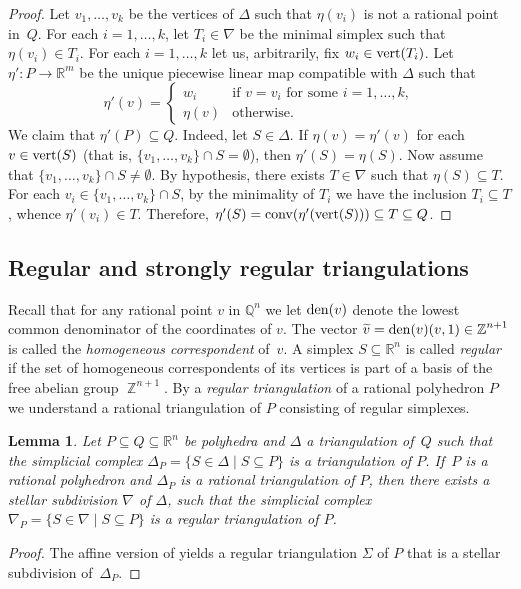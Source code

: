 \documentclass[reqno, draft]{amsart}
\newtheorem{lemma}[theorem]{Lemma}
\theoremstyle{definition}
\begin{document}
\begin{proof}
Let $v_1,\ldots,v_k$ be the vertices of $\Delta$ 
such that  $\eta(v_i)$ is not a rational point in~$Q$. 
For each $i=1,\ldots,k$, 
let $T_i\in\nabla$ be the minimal simplex  
such that  $\eta(v_i)\in T_i$. 
For each $i=1,\ldots,k$ let us, arbitrarily, 
fix $w_i\in \operatorname{{\rm vert}}(T_i)$. 
Let $\eta'\colon P\to {\mathbb{R}}^m$ 
be the unique piecewise linear map 
compatible with $\Delta$ such that 
\[
\eta'(v)=
\begin{cases}
  w_i&\mbox{if }v=v_i \mbox{ for some }i=1,\ldots,k,\\
  \eta(v)& \mbox{otherwise.}
\end{cases}
\]
We claim that $\eta'(P)\subseteq Q$. 
Indeed, let $S\in\Delta$. 
If  $\eta(v)=\eta'(v)$ for each $v\in\operatorname{{\rm vert}}(S)$ 
(that is, $\{v_1,\ldots,v_k\}\cap S=\emptyset$), 
then $\eta'(S)=\eta(S)$.
Now assume that $\{v_1,\ldots,v_k\}\cap S\neq\emptyset$. 
By hypothesis, there exists $T\in\nabla$ such that 
$\eta(S)\subseteq T$.
 For each  $v_i\in\{v_1,\ldots,v_k\}\cap S$, 
by the minimality of  $T_i$  
we have the inclusion $T_i\subseteq T$, 
whence $\eta'(v_i)\in T$. 
Therefore, $\eta'(S)=\operatorname{{\rm conv}}(\eta'(\operatorname{{\rm vert}}(S)))\subseteq T\subseteq Q$.
\end{proof}

\subsection{Regular and strongly regular triangulations}
\label{SubSec:RegularTriang}

Recall that for any rational point $v$ in ${\mathbb{Q}}^{n}$ 
we let $\operatorname{{\rm den}}(v)$ denote the lowest common denominator 
of the coordinates of $v$.
The vector $\widetilde{v}=\operatorname{{\rm den}}(v)(v,1)\in\operatorname{\mathbb{Z}}^{n+1}$ 
is called the {\it homogeneous correspondent} of~$v$.
A simplex $S\subseteq {\mathbb{R}}^{n}$ is called {\it regular} 
if the set of homogeneous correspondents of its vertices 
is part of a basis of the free abelian group $\operatorname{\mathbb{Z}}^{n+1}.$
By a {\it regular triangulation} of a rational polyhedron $P$ 
we understand a rational triangulation of $P$ 
consisting of regular simplexes.

\begin{lemma}\label{lem:RegularFromRational}
Let $P\subseteq Q\subseteq {\mathbb{R}}^n$ be polyhedra 
and $\Delta$ a triangulation of~$Q$ 
such that  the simplicial complex 
$\Delta_P=\{S\in\Delta\mid S\subseteq P\}$ 
is a  triangulation of $P$.
If~$P$ is a rational polyhedron and $\Delta_P$ 
is a rational triangulation of $P$,
then there exists  a stellar subdivision $\nabla$ of $\Delta$, 
such that the simplicial complex 
$\nabla_P=\{S\in\nabla\mid S\subseteq P\}$ 
is a regular triangulation of $P$.
\end{lemma}
\begin{proof}
The affine version of \cite[Theorem 8.5]{Ewa1996}  
yields a regular triangulation $\Sigma$ of $P$ 
that is  a stellar subdivision  of~$\Delta_P$. 
\end{proof}
\end{document}
